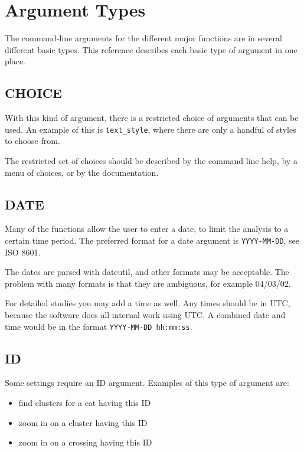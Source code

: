 \chapter{Argument Types}
\hypertarget{argument-types}{}

The command-line arguments for the different major functions are in
several different basic types. This reference describes each basic
type of argument in one place.

\section{CHOICE}
\hypertarget{argument-type-choice}{}

With this kind of argument, there is a restricted choice of arguments
that can be used. An example of this is \verb=text_style=, where there
are only a handful of styles to choose from.

The restricted set of choices should be described by the command-line
help, by a menu of choices, or by the documentation.

\section{DATE}
\hypertarget{argument-type-date}{}

Many of the functions allow the user to enter a date, to limit the
analysis to a certain time period. The preferred format for a date
argument is \verb=YYYY-MM-DD=, see ISO 8601.

The dates are parsed with dateutil, and other formats may be
acceptable. The problem with many formats is that they are ambiguous,
for example 04/03/02.

For detailed studies you may add a time as well. Any times should be
in UTC, because the software does all internal work using UTC. A
combined date and time would be in the format
\verb=YYYY-MM-DD hh:mm:ss=.

\section{ID}
\hypertarget{argument-type-id}{}

Some settings require an ID argument. Examples of this type of
argument are:

\begin{itemize}
\item find clusters for a cat having this ID
\item zoom in on a cluster having this ID
\item zoom in on a crossing having this ID
\end{itemize}

